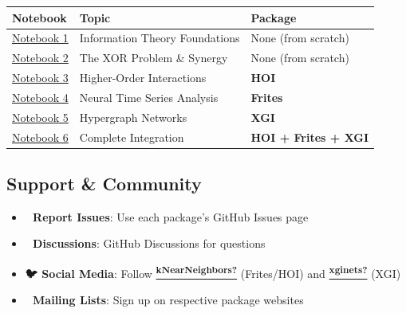 \documentclass[
  11pt,
  letterpaper,
  oneside,
  openany]{book}
\providecommand{\tightlist}{%
  \setlength{\itemsep}{0pt}\setlength{\parskip}{0pt}}
\begin{document}
\begin{longtable}[]{@{}
  >{\raggedright\arraybackslash}p{}
  >{\raggedright\arraybackslash}p{}
  >{\raggedright\arraybackslash}p{}@{}}
\toprule\noalign{}
\begin{minipage}[b]{\linewidth}\raggedright
Notebook
\end{minipage} & \begin{minipage}[b]{\linewidth}\raggedright
Topic
\end{minipage} & \begin{minipage}[b]{\linewidth}\raggedright
Package
\end{minipage} \\
\midrule\noalign{}
\endhead
\bottomrule\noalign{}
\endlastfoot
\href{01_information_theory_foundations.ipynb}{Notebook 1} & Information
Theory Foundations & None (from scratch) \\
\href{02_xor_problem_synergy.ipynb}{Notebook 2} & The XOR Problem \&
Synergy & None (from scratch) \\
\href{03_hoi_higher_order_interactions.ipynb}{Notebook 3} & Higher-Order
Interactions & \textbf{HOI} \\
\href{04_frites_neural_timeseries.ipynb}{Notebook 4} & Neural Time
Series Analysis & \textbf{Frites} \\
\href{05_xgi_hypergraph_networks.ipynb}{Notebook 5} & Hypergraph
Networks & \textbf{XGI} \\
\href{06_complete_integration.ipynb}{Notebook 6} & Complete Integration
& \textbf{HOI + Frites + XGI} \\
\end{longtable}

\subsection*{Support \& Community}\label{support-community}

\begin{itemize}
\tightlist
\item
  \textbf{🐛 Report Issues}: Use each package's GitHub Issues page
\item
  \textbf{💬 Discussions}: GitHub Discussions for questions
\item
  \textbf{🐦 Social Media}: Follow
  \href{https://twitter.com/kNearNeighbors}{\textsuperscript{\textbf{kNearNeighbors?}}}
  (Frites/HOI) and
  \href{https://twitter.com/xginets}{\textsuperscript{\textbf{xginets?}}}
  (XGI)
\item
  \textbf{📧 Mailing Lists}: Sign up on respective package websites
\end{itemize}
\end{document}
